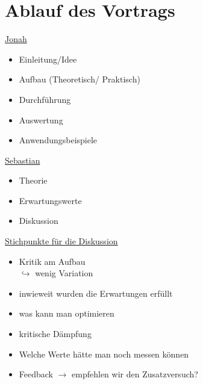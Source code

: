 



\section{Ablauf des Vortrags}

\underline{Jonah}

\begin{itemize}
  \item Einleitung/Idee
  \item Aufbau (Theoretisch/ Praktisch)
  \item Durchführung
  \item Auswertung
  \item Anwendungsbeispiele
\end{itemize}

\underline{Sebastian}

\begin{itemize}
  \item Theorie
  \item Erwartungswerte
  \item Diskussion
\end{itemize}

\underline{Stichpunkte für die Diskussion}

\begin{itemize}
  \item Kritik am Aufbau \\ $\hookrightarrow$ wenig Variation
  \item inwieweit wurden die Erwartungen erfüllt
  \item was kann man optimieren
  \item kritische Dämpfung
  \item Welche Werte hätte man noch messen können
  \item Feedback $\rightarrow$ empfehlen wir den Zusatzversuch?
\end{itemize}



